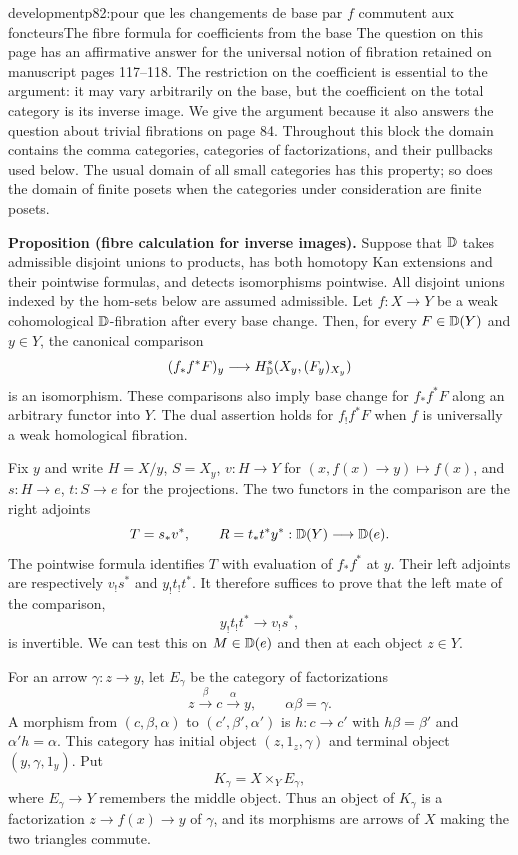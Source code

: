 \begin{dcomment}{development}{p82:pour que les changements de base par $f$ commutent aux foncteurs}{The fibre formula for coefficients from the base}
The question on this page has an affirmative answer for the universal notion of fibration retained on manuscript pages 117--118. The restriction on the coefficient is essential to the argument: it may vary arbitrarily on the base, but the coefficient on the total category is its inverse image. We give the argument because it also answers the question about trivial fibrations on page 84. Throughout this block the domain contains the comma categories, categories of factorizations, and their pullbacks used below. The usual domain of all small categories has this property; so does the domain of finite posets when the categories under consideration are finite posets.

\textbf{Proposition (fibre calculation for inverse images).}\ours
Suppose that $\mathbb{D}$ takes admissible disjoint unions to products, has both homotopy Kan extensions and their pointwise formulas, and detects isomorphisms pointwise. All disjoint unions indexed by the hom-sets below are assumed admissible. Let $f:X\to Y$ be a weak cohomological $\mathbb{D}$-fibration after every base change. Then, for every $F\in\mathbb{D}(Y)$ and $y\in Y$, the canonical comparison
\[
 (f_*f^*F)_y\longrightarrow
 H^*_{\mathbb{D}}(X_y,(F_y)_{X_y})
\]
is an isomorphism. These comparisons also imply base change for $f_*f^*F$ along an arbitrary functor into $Y$. The dual assertion holds for $f_!f^*F$ when $f$ is universally a weak homological fibration.

Fix $y$ and write $H=X/y$, $S=X_y$, $v:H\to Y$ for $(x,f(x)\to y)\mapsto f(x)$, and $s:H\to e$, $t:S\to e$ for the projections. The two functors in the comparison are the right adjoints
\[
 T=s_*v^*,\qquad R=t_*t^*y^* :\mathbb{D}(Y)\longrightarrow\mathbb{D}(e).
\]
The pointwise formula identifies $T$ with evaluation of $f_*f^*$ at $y$. Their left adjoints are respectively $v_!s^*$ and $y_!t_!t^*$. It therefore suffices to prove that the left mate of the comparison,
\[
 y_!t_!t^*\longrightarrow v_!s^*,
\]
is invertible. We can test this on $M\in\mathbb{D}(e)$ and then at each object $z\in Y$.

For an arrow $\gamma:z\to y$, let $E_\gamma$ be the category of factorizations
\[
 z\xrightarrow{\beta}c\xrightarrow{\alpha}y,
 \qquad \alpha\beta=\gamma.
\]
A morphism from $(c,\beta,\alpha)$ to $(c',\beta',\alpha')$ is $h:c\to c'$ with $h\beta=\beta'$ and $\alpha'h=\alpha$. This category has initial object $(z,1_z,\gamma)$ and terminal object $(y,\gamma,1_y)$. Put
\[
 K_\gamma=X\times_Y E_\gamma,
\]
where $E_\gamma\to Y$ remembers the middle object. Thus an object of $K_\gamma$ is a factorization $z\to f(x)\to y$ of $\gamma$, and its morphisms are arrows of $X$ making the two triangles commute.


\end{dcomment}
